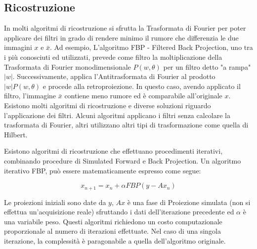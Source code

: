 \documentclass[a4paper,12pt, doubleside]{report}
\begin{document}
            \subsection{Ricostruzione}
                \par
                    In molti algoritmi di ricostruzione si sfrutta la Trasformata di Fourier per poter applicare dei filtri in grado di rendere minimo il rumore che differenzia le due immagini $x$ e $\bar{x}$. Ad esempio, L'algoritmo FBP - Filtered Back Projection, uno tra i più conosciuti ed utilizzati, prevede come filtro la moltiplicazione della Trasformata di Fourier monodimensionale $P(w,\theta)$ per un filtro detto "a rampa" $|w|$. Successivamente, applica l'Antitrasformata di Fourier al prodotto $|w|P(w, \theta)$ e procede alla retroproiezione. In questo caso, avendo applicato il filtro, l'immagine $\bar{x}$ contiene meno rumore ed è comparabile all'originale $x$. Esistono molti algoritmi di ricostruzione e diverse soluzioni riguardo l'applicazione dei filtri. Alcuni algoritmi applicano i filtri senza calcolare la trasformata di Fourier, altri utilizzano altri tipi di trasformazione come quella di Hilbert. 
                \bigskip
                \par
                    Esistono algoritmi di ricostruzione che effettuano procedimenti iterativi, combinando procedure di Simulated Forward e Back Projection. Un algoritmo iterativo FBP, può essere matematicamente espresso come segue:
                   
                   \begin{equation}
                        x_{n+1} = x_n + \alpha FBP( y - Ax_n)
                    \end{equation}
                    
                    Le proiezioni iniziali sono date da $y$, $Ax$ è una fase di Proiezione simulata (non si effettua un'acquisizione reale) sfruttando i dati dell'iterazione precedente ed $\alpha$ è una variabile peso. Questi algoritmi richiedono un costo computazionale proporzionale al numero di iterazioni effettuate. Nel caso di una singola iterazione, la complessità è paragonabile a quella dell'algoritmo originale.
                    
\end{document}
